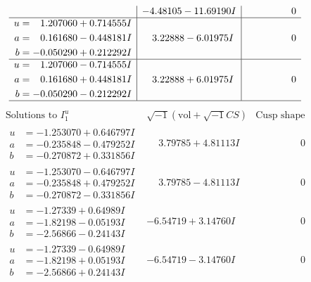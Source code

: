 \documentclass[1p]{elsarticle_modified}
\theoremstyle{definition}
\newcommand{\I}{\sqrt{-1}}
\begin{document}
$$\begin{array}{c|c|c}
 & -4.48105 - 11.69190 I & \phantom{-0.000000 } 0 \\ \hline\begin{aligned}
u &= \phantom{-}1.207060 + 0.714555 I \\
a &= \phantom{-}0.161680 - 0.448181 I \\
b &= -0.050290 + 0.212292 I\end{aligned}
 & \phantom{-}3.22888 - 6.01975 I & \phantom{-0.000000 } 0 \\ \hline\begin{aligned}
u &= \phantom{-}1.207060 - 0.714555 I \\
a &= \phantom{-}0.161680 + 0.448181 I \\
b &= -0.050290 - 0.212292 I\end{aligned}
 & \phantom{-}3.22888 + 6.01975 I & \phantom{-0.000000 } 0\\
 \hline 
 \end{array}$$\newpage$$\begin{array}{c|c|c}  
\text{Solutions to }I^u_{1}& \I (\text{vol} + \sqrt{-1}CS) & \text{Cusp shape}\\
 \hline 
\begin{aligned}
u &= -1.253070 + 0.646797 I \\
a &= -0.235848 - 0.479252 I \\
b &= -0.270872 + 0.331856 I\end{aligned}
 & \phantom{-}3.79785 + 4.81113 I & \phantom{-0.000000 } 0 \\ \hline\begin{aligned}
u &= -1.253070 - 0.646797 I \\
a &= -0.235848 + 0.479252 I \\
b &= -0.270872 - 0.331856 I\end{aligned}
 & \phantom{-}3.79785 - 4.81113 I & \phantom{-0.000000 } 0 \\ \hline\begin{aligned}
u &= -1.27339 + 0.64989 I \\
a &= -1.82198 - 0.05193 I \\
b &= -2.56866 - 0.24143 I\end{aligned}
 & -6.54719 + 3.14760 I & \phantom{-0.000000 } 0 \\ \hline\begin{aligned}
u &= -1.27339 - 0.64989 I \\
a &= -1.82198 + 0.05193 I \\
b &= -2.56866 + 0.24143 I\end{aligned}
 & -6.54719 - 3.14760 I & \phantom{-0.000000 } 0 \\ \hline\begin{aligned}

\end{aligned}
\end{array}$$
\end{document}
